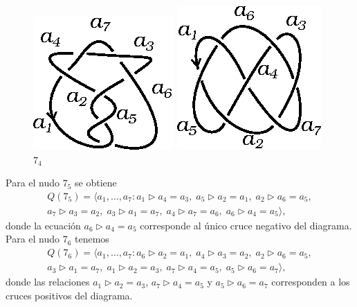 \documentclass[graybox]{svmult}
\begin{document}
	\begin{figure}[ht]
		\centering
		\begin{minipage}{0.4\textwidth}
			\centering
			\includegraphics[scale=0.7]{images/7_3}
			\caption{$7_3$}
			\label{fig:7_3}
		\end{minipage}
		\begin{minipage}{0.4\textwidth}
			\centering
	    	\includegraphics[scale=0.7]{images/7_4}
			\caption{$7_4$}
			\label{fig:7_4}
		\end{minipage}
	\end{figure}
	
	Para el nudo $7_5$ se obtiene 
	\begin{multline}
		Q(7_5)=\langle a_1,\dots,a_7:
		a_1\triangleright a_4=a_3,\;
		a_5\triangleright a_2=a_1,\;
		a_2\triangleright a_6=a_5,\\
		a_7\triangleright a_3=a_2,\;
		a_3\triangleright a_1=a_7,\;
		a_4\triangleright a_7=a_6,\;
		a_6\triangleright a_4=a_5\rangle,
	\end{multline}
    donde la ecuación $a_6\triangleright a_4=a_5$ corresponde al único cruce
    negativo del diagrama.  
	Para el nudo $7_6$ tenemos
	\begin{multline}
		Q(7_6)=\langle a_1,\dots,a_7:
		a_6\triangleright a_2=a_1,\;
		a_4\triangleright a_3=a_2,\;
		a_2\triangleright a_6=a_5,\\
		a_3\triangleright a_1=a_7,\;
		a_1\triangleright a_2=a_3,\;
		a_7\triangleright a_4=a_5,\;
		a_5\triangleright a_6=a_7\rangle,
	\end{multline}
    donde las relaciones $a_1\triangleright a_2=a_3$, $a_7\triangleright
    a_4=a_5$ y $a_5\triangleright a_6=a_7$ corresponden a los cruces positivos
    del diagrama. 
    
\end{document}
